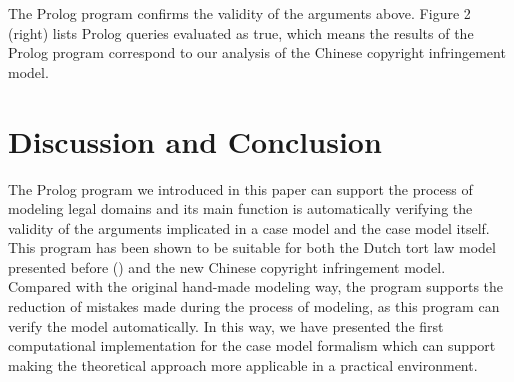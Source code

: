 \documentclass{IOS-Book-Article}
\begin{document}
\noindent The Prolog program confirms the validity of the arguments above. Figure 2 (right) lists Prolog queries evaluated as true, which means the results of the Prolog program correspond to our analysis of the Chinese copyright infringement model.

\section{Discussion and Conclusion}

\noindent 
The Prolog program we introduced in this paper can support the process of modeling legal domains and its main function is automatically verifying the validity of the arguments implicated in a case model and the case model itself. This program has been shown to be suitable for both the Dutch tort law model presented before (\cite{Verheij2017Formalizing}) and the new Chinese copyright infringement model. Compared with the original hand-made modeling way, the program supports the reduction of mistakes made during the process of modeling, as this program can verify the model automatically. In this way, we have presented the first computational implementation for the case model formalism which can support making the theoretical approach more applicable in a practical environment. 
\end{document}
